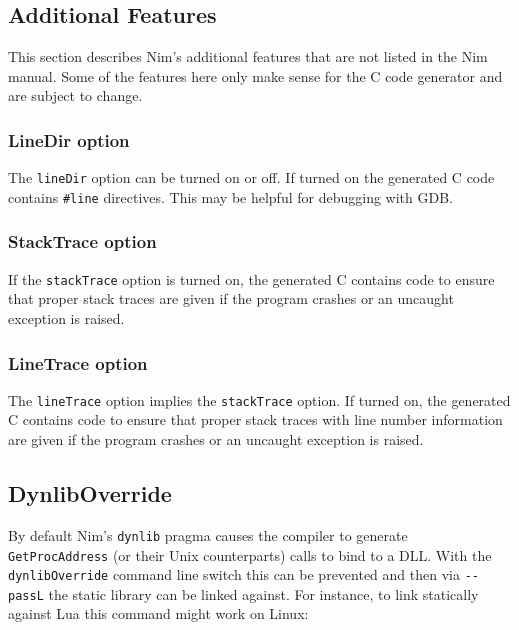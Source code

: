 \hypertarget{additional-features}{%
\subsection{Additional Features}\label{additional-features}}

This section describes Nim's additional features that are not listed in
the Nim manual. Some of the features here only make sense for the C code
generator and are subject to change.

\hypertarget{linedir-option}{%
\subsubsection{LineDir option}\label{linedir-option}}

The \texttt{lineDir} option can be turned on or off. If turned on the
generated C code contains \texttt{\#line} directives. This may be
helpful for debugging with GDB.

\hypertarget{stacktrace-option}{%
\subsubsection{StackTrace option}\label{stacktrace-option}}

If the \texttt{stackTrace} option is turned on, the generated C contains
code to ensure that proper stack traces are given if the program crashes
or an uncaught exception is raised.

\hypertarget{linetrace-option}{%
\subsubsection{LineTrace option}\label{linetrace-option}}

The \texttt{lineTrace} option implies the \texttt{stackTrace} option. If
turned on, the generated C contains code to ensure that proper stack
traces with line number information are given if the program crashes or
an uncaught exception is raised.

\hypertarget{dynliboverride}{%
\subsection{DynlibOverride}\label{dynliboverride}}

By default Nim's \texttt{dynlib} pragma causes the compiler to generate
\texttt{GetProcAddress} (or their Unix counterparts) calls to bind to a
DLL. With the \texttt{dynlibOverride} command line switch this can be
prevented and then via \texttt{-\/-passL} the static library can be
linked against. For instance, to link statically against Lua this
command might work on Linux:

